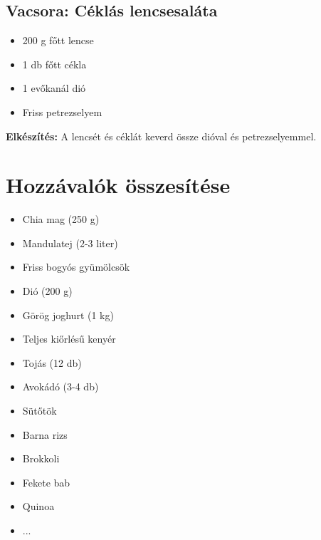 \documentclass[a4paper,12pt]{article}
\begin{document}
\subsection{Vacsora: Céklás lencsesaláta}
\begin{itemize}
    \item 200 g főtt lencse
    \item 1 db főtt cékla
    \item 1 evőkanál dió
    \item Friss petrezselyem
\end{itemize}
\textbf{Elkészítés:} A lencsét és céklát keverd össze dióval és petrezselyemmel.

\newpage

\section*{Hozzávalók összesítése}
\begin{multicols}{2}
\begin{itemize}
    \item Chia mag (250 g)
    \item Mandulatej (2-3 liter)
    \item Friss bogyós gyümölcsök
    \item Dió (200 g)
    \item Görög joghurt (1 kg)
    \item Teljes kiőrlésű kenyér
    \item Tojás (12 db)
    \item Avokádó (3-4 db)
    \item Sütőtök
    \item Barna rizs
    \item Brokkoli
    \item Fekete bab
    \item Quinoa
    \item ...
\end{itemize}
\end{multicols}
\end{document}
